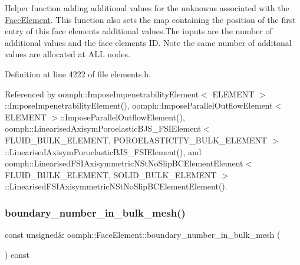 Helper function adding additional values for the unknowns associated with the \hyperlink{classoomph_1_1FaceElement}{Face\+Element}. This function also sets the map containing the position of the first entry of this face element\textquotesingle{}s additional values.\+The inputs are the number of additional values and the face element\textquotesingle{}s ID. Note the same number of additonal values are allocated at A\+LL nodes. 



Definition at line 4222 of file elements.\+h.



Referenced by oomph\+::\+Impose\+Impenetrability\+Element$<$ E\+L\+E\+M\+E\+N\+T $>$\+::\+Impose\+Impenetrability\+Element(), oomph\+::\+Impose\+Parallel\+Outflow\+Element$<$ E\+L\+E\+M\+E\+N\+T $>$\+::\+Impose\+Parallel\+Outflow\+Element(), oomph\+::\+Linearised\+Axisym\+Poroelastic\+B\+J\+S\+\_\+\+F\+S\+I\+Element$<$ F\+L\+U\+I\+D\+\_\+\+B\+U\+L\+K\+\_\+\+E\+L\+E\+M\+E\+N\+T, P\+O\+R\+O\+E\+L\+A\+S\+T\+I\+C\+I\+T\+Y\+\_\+\+B\+U\+L\+K\+\_\+\+E\+L\+E\+M\+E\+N\+T $>$\+::\+Linearised\+Axisym\+Poroelastic\+B\+J\+S\+\_\+\+F\+S\+I\+Element(), and oomph\+::\+Linearised\+F\+S\+I\+Axisymmetric\+N\+St\+No\+Slip\+B\+C\+Element\+Element$<$ F\+L\+U\+I\+D\+\_\+\+B\+U\+L\+K\+\_\+\+E\+L\+E\+M\+E\+N\+T, S\+O\+L\+I\+D\+\_\+\+B\+U\+L\+K\+\_\+\+E\+L\+E\+M\+E\+N\+T $>$\+::\+Linearised\+F\+S\+I\+Axisymmetric\+N\+St\+No\+Slip\+B\+C\+Element\+Element().

\mbox{\label{classoomph_1_1FaceElement_a7658b23bf2cf041883f51b827eab9059}} 
\subsubsection{\texorpdfstring{boundary\+\_\+number\+\_\+in\+\_\+bulk\+\_\+mesh()}{boundary\_number\_in\_bulk\_mesh()}}
{\footnotesize\ttfamily const unsigned\& oomph\+::\+Face\+Element\+::boundary\+\_\+number\+\_\+in\+\_\+bulk\+\_\+mesh (\begin{DoxyParamCaption}{ }\end{DoxyParamCaption}) const\hspace{0.3cm}{\ttfamily [inline]}}



